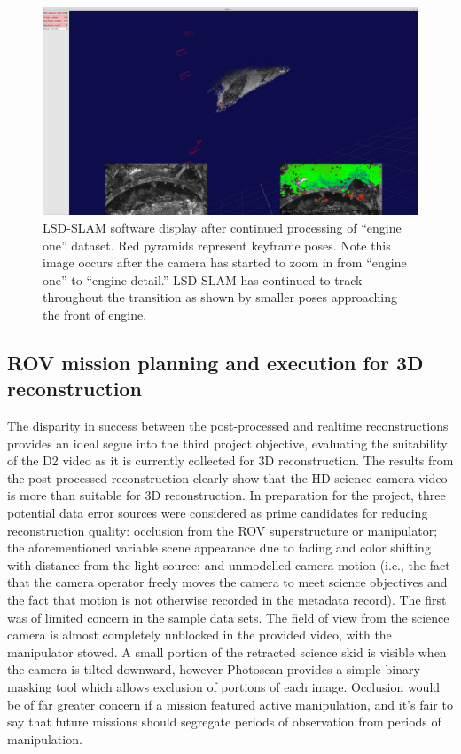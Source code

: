 \documentclass[letterpaper,12pt]{article}
\begin{document}
\begin{figure}
    \centering
    \includegraphics[width=\textwidth]{images/lsd_slam_engine.png}
    \caption{LSD-SLAM software display after continued processing of ``engine one'' dataset.  Red pyramids represent keyframe poses.   Note this image occurs after the camera has started to zoom in from ``engine one'' to ``engine detail.''  LSD-SLAM has continued to track throughout the transition as shown by smaller poses approaching the front of engine.}
    \label{fig:lsd_slam_engine_detail}
\end{figure}


 
 
\subsection{ROV mission planning and execution for 3D reconstruction}

The disparity in success between the post-processed and realtime reconstructions provides an ideal segue into the third project objective, evaluating the suitability of the D2 video as it is currently collected for 3D reconstruction.  The results from the post-processed reconstruction clearly show that the HD science camera video is more than suitable for 3D reconstruction.  In preparation for the project, three potential data error sources were considered as prime candidates for reducing reconstruction quality:   occlusion from the ROV superstructure or manipulator; the aforementioned variable scene appearance due to fading and color shifting with distance from the light source; and unmodelled camera motion (i.e., the fact that the camera operator freely moves the camera to meet science objectives and the fact that motion is not otherwise recorded in the metadata record).     The first was of limited concern in the sample data sets.    The field of view from the science camera is almost completely unblocked in the provided video, with the manipulator stowed.   A small portion of the retracted science skid is visible when the camera is tilted downward, however Photoscan provides a simple binary masking tool which allows exclusion of portions of each image.   Occlusion would be of far greater concern if a mission featured active manipulation, and it's fair to say that future missions should segregate periods of observation from periods of manipulation.
\end{document}
